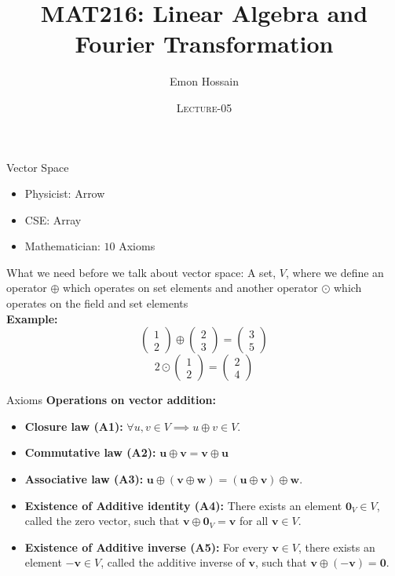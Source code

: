 \documentclass[11pt]{beamer}
\author[] %
{Emon Hossain\inst{1}}
\institute[University of Dhaka] %
{
  \inst{1}%
  Lecturer\\MNS department\\Brac University
}
\date[] %
{\textsc{Lecture-05}}
\title[]{MAT216: Linear Algebra and Fourier Transformation}
\theoremstyle{plain}
\begin{document}
\begin{frame}
\titlepage
\end{frame}

\begin{frame}{Vector Space}
    \begin{itemize}
        \item Physicist: Arrow
        \item CSE: Array 
        \item Mathematician: $10$ Axioms 
    \end{itemize}
    What we need before we talk about vector space: A set, $V$, where we define an operator $\oplus$ which operates on set elements and another operator $\odot$ which operates on the field and set elements\\
    \textbf{Example:} $$\begin{pmatrix}
        1\\2
    \end{pmatrix}\oplus\begin{pmatrix}
        2\\3
    \end{pmatrix}=\begin{pmatrix}
        3\\5
    \end{pmatrix}$$
    $$
    2\odot \begin{pmatrix}
        1\\2
    \end{pmatrix}=\begin{pmatrix}
        2\\4
    \end{pmatrix}
    $$
\end{frame}
\begin{frame}{Axioms}
    \textbf{Operations on vector addition:}
\begin{itemize}
    \item \textbf{Closure law (A1):} $\forall u,v\in V\implies u\oplus v\in V$. 
    \item \textbf{Commutative law (A2):} $\mathbf{u}\oplus\mathbf{v}=\mathbf{v}\oplus\mathbf{u}$ 
    \item \textbf{Associative law (A3):} $\mathbf{u}\oplus(\mathbf{v}\oplus\mathbf{w})=(\mathbf{u}\oplus\mathbf{v})\oplus\mathbf{w}$.
    \item \textbf{Existence of Additive identity (A4):} There exists an element $\mathbf{0}_V \in V$, called the zero vector, such that $\mathbf{v}\oplus\mathbf{0}_V=\mathbf{v}$ for all $\mathbf{v} \in V$.
    \item \textbf{Existence of Additive inverse (A5):} For every $\mathbf{v} \in V$, there exists an element $-\mathbf{v} \in V$, called the additive inverse of $\mathbf{v}$, such that $\mathbf{v}\oplus(-\mathbf{v})=\mathbf{0}$.
\end{itemize}
\end{frame}
\end{document}
